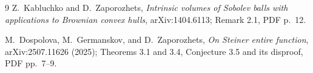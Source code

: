 \documentclass[11pt]{article}
\begin{document}
\begin{thebibliography}{9}
Z.~Kabluchko and D.~Zaporozhets,
\emph{Intrinsic volumes of Sobolev balls with applications to Brownian convex
hulls}, arXiv:1404.6113; Remark 2.1, PDF p.~12.

M.~Dospolova, M.~Germanskov, and D.~Zaporozhets,
\emph{On Steiner entire function}, arXiv:2507.11626 (2025);
Theorems 3.1 and 3.4, Conjecture 3.5 and its disproof, PDF pp.~7--9.
\end{thebibliography}
\end{document}

